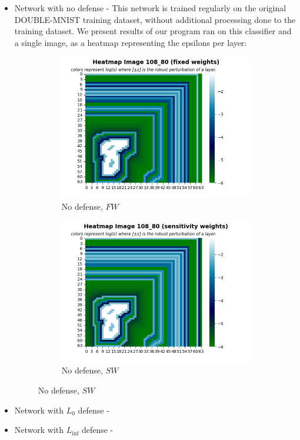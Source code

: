 \documentclass[11pt]{article}
\begin{document}
\begin{itemize}
    \item Network with no defense - This network is trained regularly on the original DOUBLE-MNIST training dataset, without additional processing done to the training dataset.
    We present results of our program ran on this classifier and a single image, as a heatmap representing the epsilons per layer:
    \begin{figure}
         \centering
         \begin{subfigure}[b]{0.4\textwidth}
             \centering
             \includegraphics[width=\textwidth]{no_defense_fixed_weights.png}
             \caption{No defense, $FW$}
             \label{No defense, $FW$}
         \end{subfigure}
         \hfill
         \begin{subfigure}[b]{0.4\textwidth}
             \centering
             \includegraphics[width=\textwidth]{no_defense_sensitivity_weights.png}
             \caption{No defense, $SW$}
             \label{No defense, $SW$}
         \end{subfigure}
         \hfill
     \end{figure}
    \item Network with $L_0$ defense -
    \item Network with $L_{\inf}$ defense -
\end{itemize}
\end{document}
